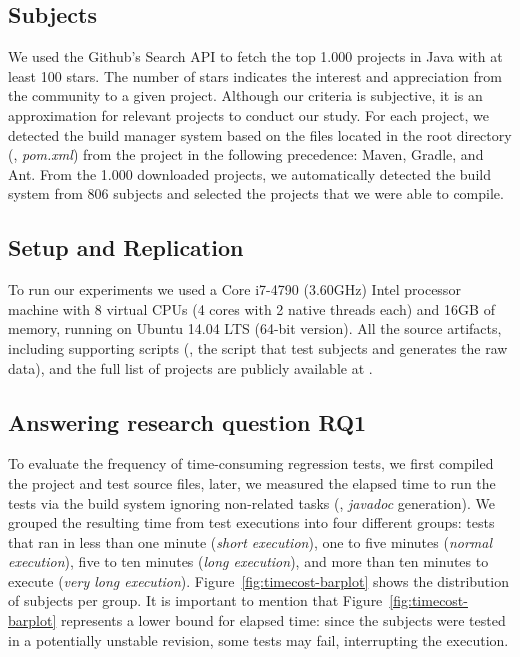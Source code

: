 \subsection{Subjects}
\label{sec:subjects}

We used the Github's Search API to fetch the top 1.000 projects in
Java with at least 100 stars. The number of stars indicates the
interest and appreciation from the community to a given project.
 Although our
criteria is subjective, it is an approximation for relevant projects
to conduct our study. For each project, we detected the build manager
system based on the files located in the root directory (\eg,
\emph{pom.xml}) from the project in the following precedence: Maven,
Gradle, and Ant. From the 1.000 downloaded projects, we automatically
detected the build system from 806 subjects and selected the 
projects that we were able to compile.

\subsection{Setup and Replication}
\label{sec:setup}

To run our experiments we used a Core i7-4790 (3.60GHz) Intel
processor machine with 8 virtual CPUs (4 cores with 2 native threads
each) and 16GB of memory, running on Ubuntu 14.04 LTS (64-bit
version).  All the source
artifacts, including supporting scripts (\eg, the script that test
subjects and generates the raw data), and the full list of projects
are publicly available at .

\subsection{Answering research question RQ1}
\label{sec:rqone}


To evaluate the frequency of time-consuming regression tests, we first
compiled the project and test source files, later, we measured the
elapsed time to run the tests via the build system ignoring
non-related tasks (\eg, \emph{javadoc} generation).  We grouped the
resulting time from test executions into four different groups: tests
that ran in less than one minute (\emph{short execution}), one to five
minutes (\emph{normal execution}), five to ten minutes (\emph{long
execution}), and more than ten minutes to execute (\emph{very long
execution}).  Figure~\ref{fig:timecost-barplot} shows the distribution
of subjects per group. It is important to mention that
Figure~\ref{fig:timecost-barplot} represents a lower bound for elapsed
time: since the subjects were tested in a potentially unstable
revision, some tests may fail, interrupting the execution.

